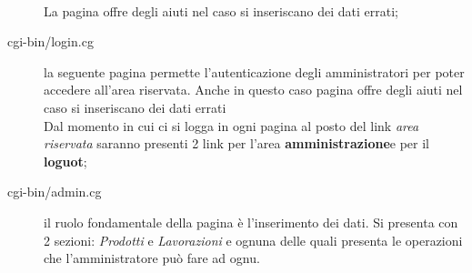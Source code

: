 \documentclass[11pt]{article}
\begin{document}
\begin{description}
	 \\La pagina offre degli aiuti nel caso si inseriscano dei dati errati;
	 \item[cgi-bin/login.cg] la seguente pagina permette l'autenticazione degli amministratori per poter accedere all'area riservata. Anche in questo caso pagina offre degli aiuti nel caso si inseriscano dei dati errati
	 \\Dal momento in cui ci si logga in ogni pagina al posto del link \textit{area riservata} saranno presenti 2 link per l'area \textbf{amministrazione}e per il \textbf{loguot};
	 \item[cgi-bin/admin.cg] il ruolo fondamentale della pagina è l'inserimento dei dati. Si presenta con 2 sezioni: \textit{Prodotti} e  \textit{Lavorazioni} e ognuna delle quali presenta le operazioni che l'amministratore può fare ad ognu.	 
\end{description}
\newpage
\end{document}
